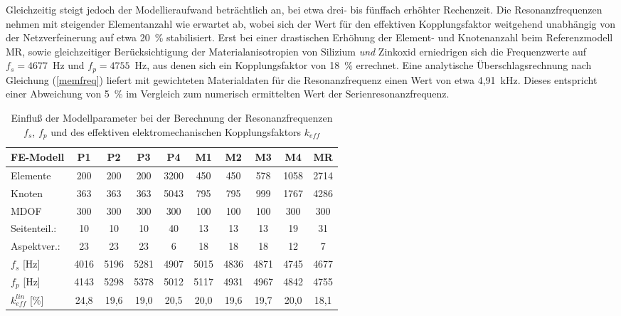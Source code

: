 Gleichzeitig steigt jedoch der Modellieraufwand beträchtlich an, bei
etwa drei- bis fünffach erhöhter Rechenzeit. Die Resonanzfrequenzen nehmen
mit steigender Elementanzahl wie erwartet ab, wobei sich der Wert für den
effektiven Kopplungsfaktor weitgehend unabhängig von der Netzverfeinerung
auf etwa 20~\% stabilisiert. Erst bei einer drastischen Erhöhung der
Element- und Knotenanzahl beim Referenzmodell MR, sowie gleichzeitiger
Berücksichtigung der Materialanisotropien von Silizium {\em und} Zinkoxid
erniedrigen sich die Frequenzwerte auf $f_{s} = 4677$~Hz und
$f_{p} = 4755$~Hz, aus denen sich ein Kopplungsfaktor von 18~\% errechnet.
Eine analytische Überschlagsrechnung nach Gleichung (\ref{memfreq}) liefert
mit gewichteten Materialdaten für die Resonanzfrequenz einen Wert von etwa
4,91~kHz. Dieses entspricht einer Abweichung von 5~\% im Vergleich zum
numerisch ermittelten Wert der Serienresonanzfrequenz. \\
\begin{table}[htb]
\caption{\label{tabmodellparamkeff}
 Einfluß der Modellparameter bei der Berechnung der Resonanzfrequenzen
 $f_{s}$, $f_{p}$ und des effektiven elektromechanischen
 Kopplungsfaktors $k_{eff}$}
\begin{center}
\begin{tabular} {|l||c|c|c|c||c|c|c|c||c|}
\hline
 FE-Modell & P1 & P2 & P3 & P4 & M1 & M2 & M3 & M4 & MR \\
\hline \hline
 Elemente  & 200 & 200 & 200 & 3200 & 450 & 450 & 578 & 1058 & 2714 \\
 Knoten    & 363 & 363 & 363 & 5043 & 795 & 795 & 999 & 1767 & 4286 \\
 MDOF      & 300 & 300 & 300 & 300  & 100 & 100 & 100 & 300  & 300 \\
\hline
 Seitenteil.: & 10 & 10 & 10 & 40 & 13 & 13 & 13 & 19 & 31 \\
 Aspektver.:  & 23 & 23 & 23 & 6  & 18 & 18 & 18 & 12 & 7  \\
\hline \hline
 $f_{s}$ [Hz] & 4016 & 5196 & 5281 & 4907 & 5015 & 4836 & 4871 & 4745 & 4677 \\
 $f_{p}$ [Hz] & 4143 & 5298 & 5378 & 5012 & 5117 & 4931 & 4967 & 4842 & 4755 \\
\hline
 $k^{lin}_{eff}$ [\%]
 & 24,8 & 19,6 & 19,0 & 20,5 & 20,0 & 19,6 & 19,7 & 20,0 & 18,1 \\
\hline
\end{tabular}\\
\end{center}
\end{table}

